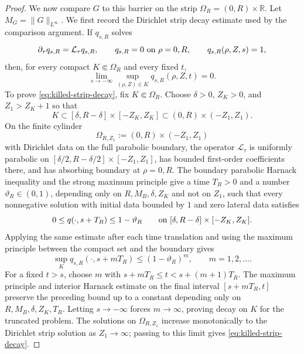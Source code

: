\documentclass[11pt]{amsart}
\numberwithin{equation}{section}
\theoremstyle{plain}
\theoremstyle{definition}
\theoremstyle{remark}
\begin{document}
\begin{proof}
We now compare \(G\) to this barrier on the strip
\(\Omega_R=(0,R)\times\mathbb R\).  Let
\(M_G=\|G\|_{L^\infty}\).  We first record the Dirichlet strip decay estimate used
by the comparison argument.  If \(q_{s,R}\) solves
\[
   \partial_\tau q_{s,R}=\mathcal L_\tau q_{s,R},
   \qquad q_{s,R}=0\hbox{ on }\rho=0,R,
   \qquad q_{s,R}(\rho,Z,s)=1,
\]
then, for every compact \(K\Subset\Omega_R\) and every fixed \(t\),
\begin{equation}\label{eq:killed-strip-decay}
   \lim_{s\to-\infty}\sup_{(\rho,Z)\in K}q_{s,R}(\rho,Z,t)=0 .
\end{equation}
To prove \eqref{eq:killed-strip-decay}, fix \(K\Subset\Omega_R\).  Choose
\(\delta>0\), \(Z_K>0\), and \(Z_1>Z_K+1\) so that
\[
   K\subset [\delta,R-\delta]\times[-Z_K,Z_K]
   \subset (0,R)\times(-Z_1,Z_1).
\]
On the finite cylinder
\[
   \Omega_{R,Z_1}:=(0,R)\times(-Z_1,Z_1)
\]
with Dirichlet data on the full parabolic boundary, the operator
\(\mathcal L_\tau\) is uniformly parabolic on
\([\delta/2,R-\delta/2]\times[-Z_1,Z_1]\), has bounded first-order coefficients
there, and has absorbing boundary at \(\rho=0,R\).  The boundary parabolic
Harnack inequality and the strong maximum principle give a time \(T_R>0\) and a
number \(\vartheta_R\in(0,1)\), depending only on
\(R,M_B,\delta,Z_K\) and not on \(Z_1\), such that every nonnegative solution
with initial data bounded by \(1\) and zero lateral data satisfies
\[
   0\le q(\cdot,s+T_R)\le 1-\vartheta_R
   \qquad\hbox{on }[\delta,R-\delta]\times[-Z_K,Z_K].
\]
Applying the same estimate after each time translation and using the maximum
principle between the compact set and the boundary gives
\[
   \sup_K q_{s,R}(\cdot,s+mT_R)
   \le (1-\vartheta_R)^m,\qquad m=1,2,\dots .
\]
For a fixed \(t>s\), choose \(m\) with
\(s+mT_R\le t<s+(m+1)T_R\).  The maximum principle and interior Harnack estimate
on the final interval \([s+mT_R,t]\) preserve the preceding bound up to a
constant depending only on \(R,M_B,\delta,Z_K,T_R\).  Letting \(s\to-\infty\)
forces \(m\to\infty\), proving decay on \(K\) for the truncated problem.  The
solutions on \(\Omega_{R,Z_1}\) increase monotonically to the Dirichlet strip
solution as \(Z_1\to\infty\); passing to this limit gives
\eqref{eq:killed-strip-decay}.


\end{proof}
\end{document}

